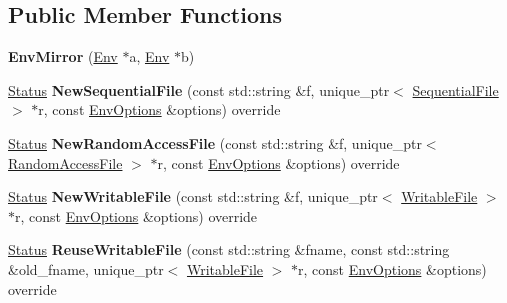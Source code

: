 \subsection*{Public Member Functions}
\begin{DoxyCompactItemize}
\item 
{\bfseries Env\+Mirror} (\hyperlink{classrocksdb_1_1Env}{Env} $\ast$a, \hyperlink{classrocksdb_1_1Env}{Env} $\ast$b)\hypertarget{classrocksdb_1_1EnvMirror_aa9d54e018f6c63551982ba4110010527}{}\label{classrocksdb_1_1EnvMirror_aa9d54e018f6c63551982ba4110010527}

\item 
\hyperlink{classrocksdb_1_1Status}{Status} {\bfseries New\+Sequential\+File} (const std\+::string \&f, unique\+\_\+ptr$<$ \hyperlink{classrocksdb_1_1SequentialFile}{Sequential\+File} $>$ $\ast$r, const \hyperlink{structrocksdb_1_1EnvOptions}{Env\+Options} \&options) override\hypertarget{classrocksdb_1_1EnvMirror_af42cb2435858ab1e73fd212a7b953c6a}{}\label{classrocksdb_1_1EnvMirror_af42cb2435858ab1e73fd212a7b953c6a}

\item 
\hyperlink{classrocksdb_1_1Status}{Status} {\bfseries New\+Random\+Access\+File} (const std\+::string \&f, unique\+\_\+ptr$<$ \hyperlink{classrocksdb_1_1RandomAccessFile}{Random\+Access\+File} $>$ $\ast$r, const \hyperlink{structrocksdb_1_1EnvOptions}{Env\+Options} \&options) override\hypertarget{classrocksdb_1_1EnvMirror_a4a192d3e03b23da2891392c43538f4fe}{}\label{classrocksdb_1_1EnvMirror_a4a192d3e03b23da2891392c43538f4fe}

\item 
\hyperlink{classrocksdb_1_1Status}{Status} {\bfseries New\+Writable\+File} (const std\+::string \&f, unique\+\_\+ptr$<$ \hyperlink{classrocksdb_1_1WritableFile}{Writable\+File} $>$ $\ast$r, const \hyperlink{structrocksdb_1_1EnvOptions}{Env\+Options} \&options) override\hypertarget{classrocksdb_1_1EnvMirror_ab0cd5ef3e36ddd53bf3a7f4d622fef1d}{}\label{classrocksdb_1_1EnvMirror_ab0cd5ef3e36ddd53bf3a7f4d622fef1d}

\item 
\hyperlink{classrocksdb_1_1Status}{Status} {\bfseries Reuse\+Writable\+File} (const std\+::string \&fname, const std\+::string \&old\+\_\+fname, unique\+\_\+ptr$<$ \hyperlink{classrocksdb_1_1WritableFile}{Writable\+File} $>$ $\ast$r, const \hyperlink{structrocksdb_1_1EnvOptions}{Env\+Options} \&options) override\hypertarget{classrocksdb_1_1EnvMirror_a19cf54de09f54692019c2bf7c720a705}{}\label{classrocksdb_1_1EnvMirror_a19cf54de09f54692019c2bf7c720a705}


\end{DoxyCompactItemize}
